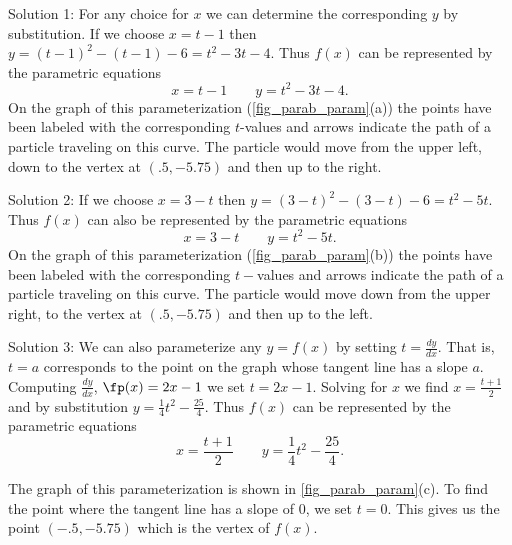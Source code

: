{Solution 1: For any choice for $x$ we can determine the corresponding $y$ by substitution. If we choose $x=t-1$ then $y=(t-1)^2-(t-1)-6=t^2-3t-4$. Thus $f(x)$ can be represented by the parametric equations
\[x=t-1 \qquad y=t^2-3t-4.\]
On the graph of this parameterization (\autoref{fig_parab_param}(a)) the points have been labeled with the corresponding $t$-values and arrows indicate the path of a particle traveling on this curve. The particle would move from the upper left, down to the vertex at $(.5,-5.75)$ and then up to the right.

Solution 2: If we choose $x=3-t$ then $y=(3-t)^2-(3-t)-6=t^2-5t$. Thus $f(x)$ can also be represented by the parametric equations
\[x=3-t \qquad y=t^2-5t.\]
On the graph of this parameterization (\autoref{fig_parab_param}(b)) the points have been labeled with the corresponding $t-$values and arrows indicate the path of a particle traveling on this curve. The particle would move down from the upper right, to the vertex at $(.5,-5.75)$ and then up to the left.

Solution 3: We can also parameterize any $y=f(x)$ by setting $t=\frac{dy}{dx}$. That is, $t=a$ corresponds to the point on the graph whose tangent line has a slope $a$. Computing $\frac{dy}{dx}$, $\fp(x) = 2x-1$ we set $t=2x-1$. Solving for $x$ we find $x=\frac{t+1}{2}$ and by substitution $y=\frac{1}{4}t^2 - \frac{25}{4}$. Thus $f(x)$ can be represented by the parametric equations
\[x=\frac{t+1}{2} \qquad y=\frac{1}{4}t^2 - \frac{25}{4}.\]

The graph of this parameterization is shown in \autoref{fig_parab_param}(c). To find the point where the tangent line has a slope of $0$, we set $t=0$. This gives us the point $(-.5, -5.75)$ which is the vertex of $f(x)$.}


